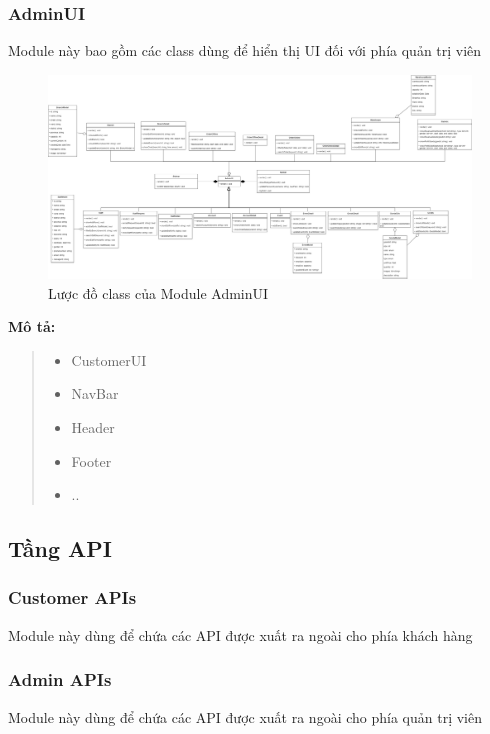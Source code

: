 \subsubsection{AdminUI}
Module này bao gồm các class dùng để hiển thị UI đối với phía quản trị viên

\begin{figure}[!htp]
	\centering
	\includegraphics[width=17cm]{img/Architecture/UI/adminUI.png}
	\newline
	\caption{Lược đồ class của Module AdminUI}
\end{figure}
\textbf{Mô tả:}
\begin{quote}
	\begin{itemize}
		\item CustomerUI
		\item NavBar
		\item Header
		\item Footer
		\item ..
	\end{itemize}
\end{quote}





\subsection{Tầng API}
\subsubsection{Customer APIs}
Module này dùng để chứa các API được xuất ra ngoài cho phía khách hàng

\subsubsection{Admin APIs}
Module này dùng để chứa các API được xuất ra ngoài cho phía quản trị viên

